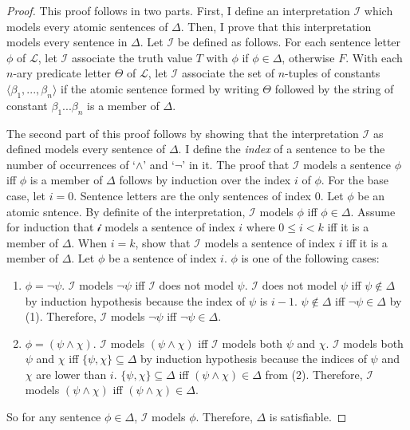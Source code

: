 \documentclass[12pt]{article}
\theoremstyle{definition}
\theoremstyle{remark}
\begin{document}
\begin{proof}
	This proof follows in two parts. First, I define an interpretation $\mathscr{I}$ which models every atomic sentences of $\Delta$. Then, I prove that this interpretation models every sentence in $\Delta$. Let $\mathscr{I}$ be defined as follows. For each sentence letter $\phi$ of $\mathscr{L}$, let $\mathscr{I}$ associate the truth value $T$ with $\phi$ if $\phi \in \Delta$, otherwise $F$. With each $n$-ary predicate letter $\Theta$ of $\mathscr{L}$, let $\mathscr{I}$ associate the set of $n$-tuples of constants $\langle \beta_1, ..., \beta_n \rangle$ if the atomic sentence formed by writing $\Theta$ followed by the string of constant $\beta_1...\beta_n$ is a member of $\Delta$.
	
	The second part of this proof follows by showing that the interpretation $\mathscr{I}$ as defined models every sentence of $\Delta$. I define the \textit{index} of a sentence to be the number of occurrences of `$\land$' and `$\neg$' in it.  The proof that $\mathscr{I}$ models a sentence $\phi$ iff $\phi$ is a member of $\Delta$ follows by induction over the index $i$ of $\phi$. For the base case, let $i=0$. Sentence letters are the only sentences of index 0. Let $\phi$ be an atomic sntence. By definite of the interpretation, $\mathscr{I}$ models $\phi$ iff $\phi \in \Delta$. Assume for induction that $\mathscr{i}$ models a sentence of index $i$ where $0 \leq i < k$ iff it is a member of $\Delta$. When $i=k$, show that $\mathscr{I}$ models a sentence of index $i$ iff it is a member of $\Delta$. Let $\phi$ be a sentence of index $i$. $\phi$ is one of the following cases: 
	
	\begin{enumerate}
		\item $\phi = \neg\psi$. $\mathscr{I}$ models $\neg\psi$ iff $\mathscr{I}$ does not model $\psi$. $\mathscr{I}$ does not model $\psi$ iff $\psi \not\in \Delta$ by induction hypothesis because the index of $\psi$ is $i-1$. $\psi \not\in \Delta$ iff $\neg\psi \in \Delta$ by (1). Therefore, $\mathscr{I}$ models $\neg\psi$ iff $\neg\psi \in \Delta$.
		\item $\phi = (\psi \land \chi)$. $\mathscr{I}$ models $(\psi \land \chi)$ iff $\mathscr{I}$ models both $\psi$ and $\chi$. $\mathscr{I}$ models both $\psi$ and $\chi$ iff $\{ \psi, \chi \} \subseteq \Delta$ by induction hypothesis because the indices of $\psi$ and $\chi$ are lower than $i$. $\{ \psi, \chi \} \subseteq \Delta$ iff $(\psi \land \chi) \in \Delta$ from (2). Therefore, $\mathscr{I}$ models $(\psi \land \chi)$ iff $(\psi \land \chi) \in \Delta$.
	\end{enumerate}
	
	So for any sentence $\phi \in \Delta$, $\mathscr{I}$ models $\phi$. Therefore, $\Delta$ is satisfiable.
\end{proof}
\end{document}
